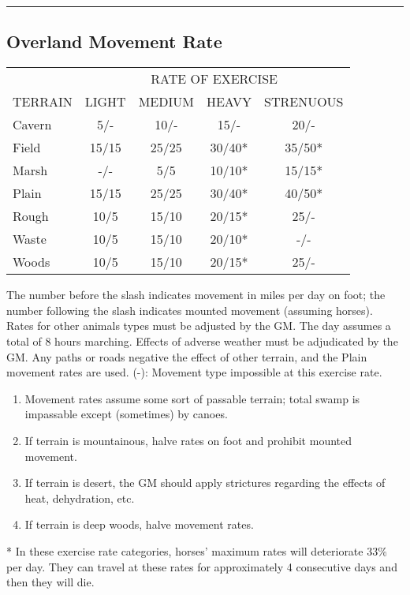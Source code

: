 \rule{\linewidth}{0.6mm}

\begin{multicols}{2}
\subsection{Overland Movement Rate}
\label{tables:overland}

\begin{tabularx}{0.8\linewidth}{Xcccc}
& \multicolumn{4}{c}{\tiny\textsc{RATE OF EXERCISE}} \\
{\tiny\textsc{TERRAIN}} &
{\tiny\textsc{LIGHT}} &
{\tiny\textsc{MEDIUM}} &
{\tiny\textsc{HEAVY}} &
{\tiny\textsc{STRENUOUS}} \\
\hline
Cavern	& 5/-	& 10/-	& 15/-	& 20/- \\
\hline
Field	& 15/15	& 25/25	& 30/40* & 35/50* \\
\hline
Marsh	& -/-	& 5/5	& 10/10* & 15/15* \\
\hline
Plain	& 15/15 & 25/25	& 30/40* & 40/50* \\
\hline
Rough	& 10/5	& 15/10	& 20/15* & 25/-	\\
\hline
Waste	& 10/5	& 15/10	& 20/10* & -/-	\\
\hline
Woods	& 10/5	& 15/10 & 20/15* & 25/- \\
\hline
\end{tabularx}

\smallskip

The number before the slash indicates movement in miles per day on
foot; the number following the slash indicates mounted movement
(assuming horses).  Rates for other animals types must be adjusted by
the GM.  The day assumes a total of 8 hours marching.  Effects of
adverse weather must be adjudicated by the GM. Any paths or roads
negative the effect of other terrain, and the Plain movement rates are
used. (-): Movement type impossible at this exercise rate.

\begin{enumerate}
\item
Movement rates assume some sort of passable terrain; total swamp is
impassable except (sometimes) by canoes.

\item
If terrain is mountainous, halve rates on foot and prohibit mounted
movement.

\item
If terrain is desert, the GM should apply strictures regarding the
effects of heat, dehydration, etc.

\item
If terrain is deep woods, halve movement rates.
\end{enumerate}

* In these exercise rate categories, horses' maximum rates will
deteriorate 33\% per day.  They can travel at these rates for
approximately 4 consecutive days and then they will die.

\end{multicols}
